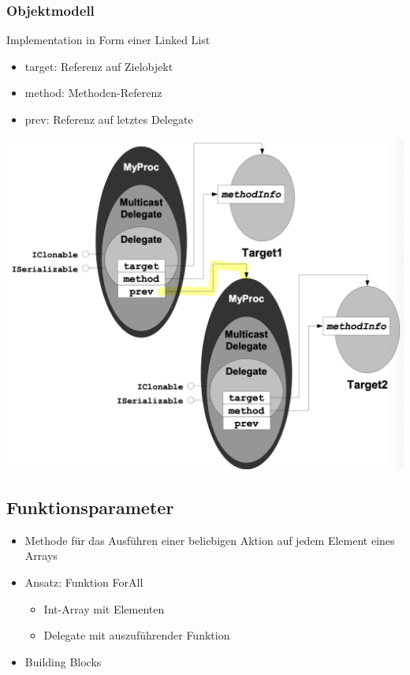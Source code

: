 \subsubsection{Objektmodell}
Implementation in Form einer Linked List
\begin{itemize}
    \item target: Referenz auf Zielobjekt
    \item method: Methoden-Referenz
    \item prev: Referenz auf letztes Delegate
\end{itemize}

\vspace{-8pt}
\begin{center}
    \includegraphics[scale=.34]{graphic/delegate/Objektmodell.png}
\end{center}
\vspace{-8pt}

\subsection{Funktionsparameter}
\begin{itemize}
    \item Methode für das Ausführen einer beliebigen Aktion auf jedem Element eines Arrays
    \item Ansatz: Funktion ForAll
    \begin{itemize}
        \item Int-Array mit Elementen
        \item Delegate mit auszuführender Funktion
    \end{itemize}
    \item Building Blocks
\end{itemize}


